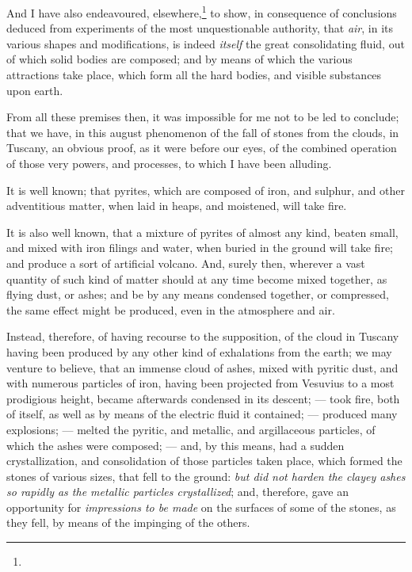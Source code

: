 \documentclass[a4paper, 12pt, oneside, twocolumn]{article}
\begin{document}
And I have also endeavoured, elsewhere,\footnote{} to show, in consequence of conclusions deduced from experiments of the most unquestionable authority, that \emph{air}, in its various shapes and modifications, is indeed \emph{itself} the great consolidating fluid, out of which solid bodies are composed; and by means of which the various attractions take place, which form all the hard bodies, and visible substances upon earth.

From all these premises then, it was impossible for me not to be led to conclude; that we have, in this august phenomenon of the fall of stones from the clouds, in Tuscany, an obvious proof, as it were before our eyes, of the combined operation of those very powers, and processes, to which I have been alluding.

It is well known; that pyrites, which are composed of iron, and sulphur, and other adventitious matter, when laid in heaps, and moistened, will take fire.

It is also well known, that a mixture of pyrites of almost any kind, beaten small, and mixed with iron filings and water, when buried in the ground will take fire; and produce a sort of artificial volcano. And, surely then, wherever a vast quantity of such kind of matter should at any time become mixed together, as flying dust, or ashes; and be by any means condensed together, or compressed, the same effect might be produced, even in the atmosphere and air.

Instead, therefore, of having recourse to the supposition, of the cloud in Tuscany having been produced by any other kind of exhalations from the earth; we may venture to believe, that an immense cloud of ashes, mixed with pyritic dust, and with numerous particles of iron, having been projected from Vesuvius to a most prodigious height, became afterwards condensed in its descent; --- took fire, both of itself, as well as by means of the electric fluid it contained; --- produced many explosions; --- melted the pyritic, and metallic, and argillaceous particles, of which the ashes were composed; --- and, by this means, had a sudden crystallization, and consolidation of those particles taken place, which formed the stones of various sizes, that fell to the ground: \emph{but did not harden the clayey ashes so rapidly as the metallic particles crystallized}; and, therefore, gave an opportunity for \emph{impressions to be made} on the surfaces of some of the stones, as they fell, by means of the impinging of the others.
\end{document}
